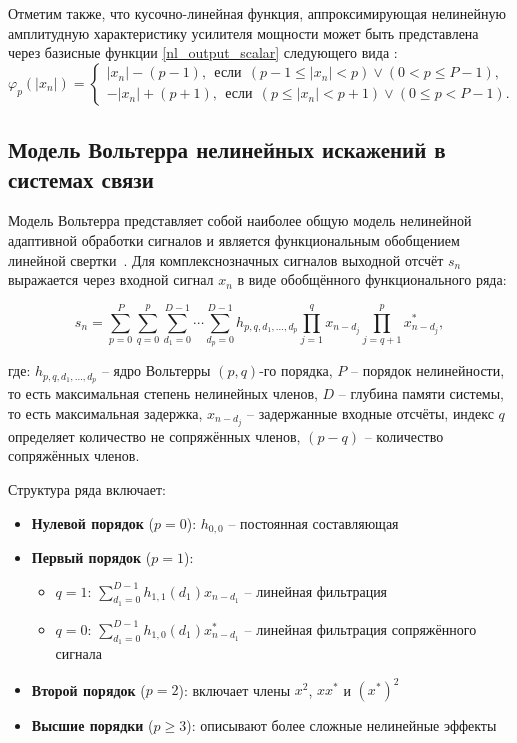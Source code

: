 Отметим также, что кусочно-линейная функция, аппроксимирующая нелинейную амплитудную характеристику усилителя мощности может быть представлена через базисные функции \eqref{nl_output_scalar} следующего вида \cite{dpd_lut}:
\begin{equation}
	\varphi_p(|x_n|)=
	\begin{cases}
		|x_n|-(p-1), \ \ \text{если} \ \ (p-1\leqslant|x_n|<p) \vee (0<p\leqslant P-1),\\
		-|x_n|+(p+1), \ \ \text{если} \ \ (p\leqslant|x_n|<p+1) \vee (0\leqslant p<P-1).
	\end{cases}
	\label{spline_basis}
\end{equation}

\subsection{Модель Вольтерра нелинейных искажений в системах связи} \label{subsec:volterra}

Модель Вольтерра представляет собой наиболее общую модель нелинейной адаптивной обработки сигналов и является функциональным обобщением линейной свертки~\cite{volterra1959theory,schetzen1980volterra,mathews1991adaptive}. Для комплекснозначных сигналов выходной отсчёт $s_n$ выражается через входной сигнал $x_n$ в виде обобщённого функционального ряда:

\begin{equation}
	s_n = \sum_{p=0}^{P} \sum_{q=0}^{p} \sum_{d_1=0}^{D-1} \cdots \sum_{d_p=0}^{D-1} h_{p,q,d_1,\ldots,d_p} \prod_{j=1}^{q} x_{n-d_j} \prod_{j=q+1}^{p} x^*_{n-d_j},
	\label{volterra_complex}
\end{equation}

где:
$h_{p,q,d_1,\ldots,d_p}$ -- ядро Вольтерры $(p,q)$-го порядка, $P$ -- порядок нелинейности, то есть максимальная степень нелинейных членов, $D$ -- глубина памяти системы, то есть максимальная задержка, $x_{n-d_j}$ -- задержанные входные отсчёты, индекс $q$ определяет количество не сопряжённых членов, $(p-q)$ -- количество сопряжённых членов.

Структура ряда включает:
\begin{itemize}
	\item \textbf{Нулевой порядок} ($p=0$): $h_{0,0}$ -- постоянная составляющая
	\item \textbf{Первый порядок} ($p=1$): 
	\begin{itemize}
		\item $q=1$: $\sum_{d_1=0}^{D-1} h_{1,1}(d_1)x_{n-d_1}$ -- линейная фильтрация
		\item $q=0$: $\sum_{d_1=0}^{D-1} h_{1,0}(d_1)x^*_{n-d_1}$ -- линейная фильтрация сопряжённого сигнала
	\end{itemize}
	\item \textbf{Второй порядок} ($p=2$): включает члены $x^2$, $x x^*$ и $(x^*)^2$
	\item \textbf{Высшие порядки} ($p\geq3$): описывают более сложные нелинейные эффекты
\end{itemize}

